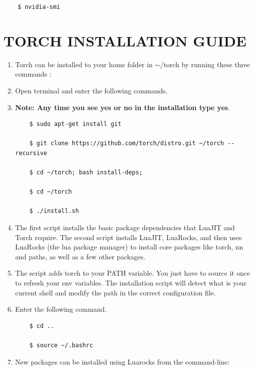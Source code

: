 \documentclass[12pt]{article}
\begin{document}
\begin{lstlisting}
    $ nvidia-smi
\end{lstlisting}

\newpage
\section{TORCH INSTALLATION GUIDE}

\begin{enumerate}
    \item Torch can be installed to your home folder in {\tiny $\sim$}/torch by running these three commands \cite{TORCH}:
    \item Open terminal and enter the following commands.
    \item \textbf{Note: Any time you see yes or no in the installation type yes}.

\begin{lstlisting}
    $ sudo apt-get install git

    $ git clone https://github.com/torch/distro.git ~/torch --recursive

    $ cd ~/torch; bash install-deps;

    $ cd ~/torch

    $ ./install.sh
\end{lstlisting}

    \item The first script installs the basic package dependencies that LuaJIT and Torch require. The second script installs LuaJIT, LuaRocks, and then uses LuaRocks (the lua package manager) to install core packages like torch, nn and paths, as well as a few other packages.

    \item The script adds torch to your PATH variable. You just have to source it once to refresh your env variables. The installation script will detect what is your current shell and modify the path in the correct configuration file.
    \item Enter the following command.

\begin{lstlisting}
    $ cd ..

    $ source ~/.bashrc
\end{lstlisting}

    \item New packages can be installed using Luarocks from the command-line:
\end{enumerate}
\end{document}
